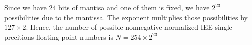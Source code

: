 \begin{questions}

\begin{solution}
Since we have 24 bits of mantisa and one of them is fixed, we have $2^{23}$ possibilities due to the mantissa. The exponent multiplies those possibilities by $127\times 2$. Hence, the number of possible nonnegative normalized IEE single precitions floating point numbers is $N=254\times 2^{23}$
\end{solution}
\end{questions}